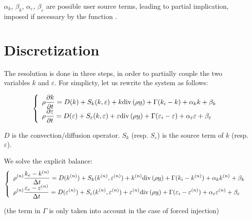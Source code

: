 $\alpha_k$, $\beta_k$, $\alpha_\varepsilon$, $\beta_\varepsilon$ are possible
user source terms, leading to partial implication,
imposed if necessary by the function .

\section*{Discretization}
The resolution is done in three steps, in order to partially couple the two variables
$k$ and $\varepsilon$. For simplicty, let us rewrite the system as follows:

\begin{equation}
\left\{\begin{array}{l}
\displaystyle
\rho\frac{\partial k}{\partial t} =
D(k) + S_k(k,\varepsilon)+k\text{div}\,(\rho\underline{u})+\Gamma(k_i-k)+\alpha_k k +\beta_k\\
\displaystyle
\rho\frac{\partial \varepsilon}{\partial t}  =
D(\varepsilon) + S_\varepsilon(k,\varepsilon)
+\varepsilon\text{div}\,(\rho\underline{u})
+\Gamma(\varepsilon_i-\varepsilon)+\alpha_\varepsilon \varepsilon +\beta_\varepsilon
\end{array}\right.
\end{equation}

$D$ is the convection/diffusion operator.
$S_k$ (resp. $S_\varepsilon$) is the source term of $k$ (resp. $\varepsilon$).


We solve the explicit balance:
\begin{equation}
\left\{\begin{array}{l}
\displaystyle
\rho^{(n)}\frac{k_e-k^{(n)}}{\Delta t} =
D(k^{(n)}) + S_k(k^{(n)},\varepsilon^{(n)})
+k^{(n)}\text{div}\,(\rho\underline{u})+\Gamma(k_i-k^{(n)})+\alpha_k k^{(n)} +\beta_k\\
\displaystyle
\rho^{(n)}\frac{\varepsilon_e-\varepsilon^{(n)}}{\Delta t}  =
D(\varepsilon^{(n)}) + S_\varepsilon(k^{(n)},\varepsilon^{(n)})
+\varepsilon^{(n)}\text{div}\,(\rho\underline{u})
+\Gamma(\varepsilon_i-\varepsilon^{(n)})
+\alpha_\varepsilon \varepsilon^{(n)} +\beta_\varepsilon
\end{array}\right.
\end{equation}

(the term in $\Gamma$ is only taken into account in the case of forced injection)

